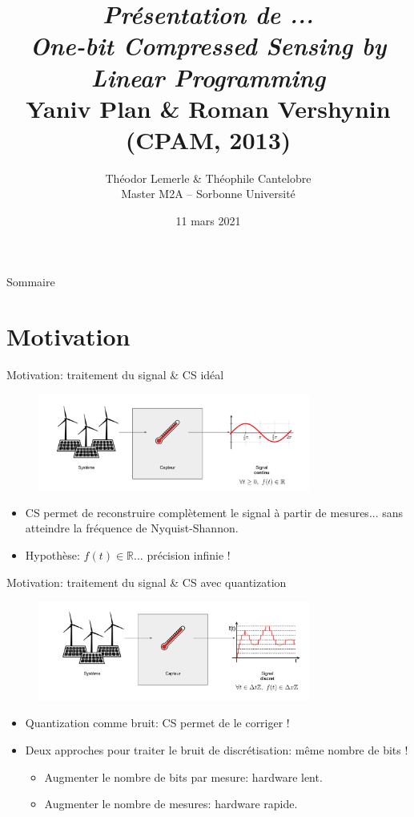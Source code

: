 \documentclass[10pt, aspectratio=169]{beamer}
\title{\emph{Présentation de ...} \\ \emph{One-bit Compressed Sensing by Linear Programming}\\ Yaniv Plan \& Roman Vershynin (CPAM, 2013)}
\date{11 mars 2021}
\author{Théodor Lemerle \& Théophile Cantelobre \\ 
Master M2A -- Sorbonne Université}
\begin{document}
  \maketitle
  
  \begin{frame}{Sommaire}
  \tableofcontents{}
  \end{frame}
  
  \section{Motivation}
  \begin{frame}[t]{Motivation: traitement du signal \& CS idéal}
 \begin{figure}
     \centering
     \includegraphics[width=0.8\textwidth]{figures/continous.png}
 \end{figure} 
  \begin{itemize}
      \item CS permet de reconstruire complètement le signal à partir de mesures... sans atteindre la fréquence de Nyquist-Shannon.
      \item Hypothèse: $f(t)\in\mathbb{R}$... précision infinie !
  \end{itemize}
  \end{frame}
  
  \begin{frame}[t]{Motivation: traitement du signal \& CS avec quantization}
 \begin{figure}
     \centering
     \includegraphics[width=0.8\textwidth]{figures/discrete.png}
 \end{figure} 
  \begin{itemize}
      \item Quantization comme bruit: CS permet de le corriger !
      \item Deux approches pour traiter le bruit de discrétisation: même nombre de bits !
      \begin{itemize}
          \item Augmenter le nombre de bits par mesure: hardware lent.
          \item Augmenter le nombre de mesures: hardware rapide.
      \end{itemize}
  \end{itemize}
  \end{frame}
\end{document}
